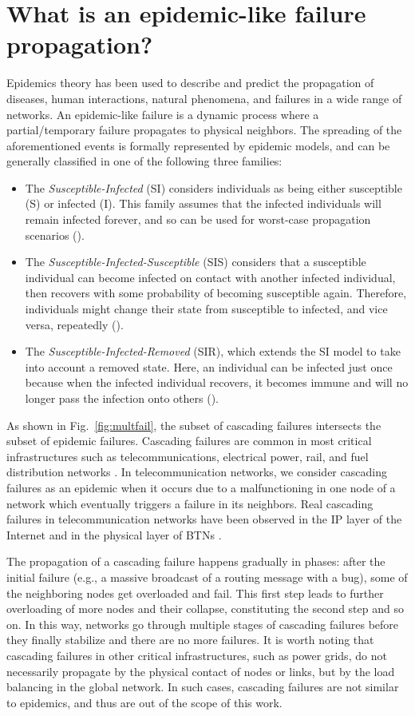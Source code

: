 \documentclass[10pt,draftclsnofoot,onecolumn,journal]{IEEEtran}
\begin{document}
\section{What is an epidemic-like failure propagation?\label{soa}}

Epidemics theory has been used to describe and predict the propagation of diseases, human interactions, natural phenomena, and failures in a wide range of networks. An epidemic-like failure is a dynamic process where a partial/temporary failure propagates to physical neighbors. The spreading of the aforementioned events is formally represented by epidemic models, and can be generally classified in one of the following three families:
\begin{itemize}
	\item The \emph{Susceptible-Infected} (SI) considers individuals as being either susceptible (S) or infected (I). This family assumes that the infected individuals will remain infected forever, and so can be used for worst-case propagation scenarios ().
	\item The \textit{Susceptible-Infected-Susceptible} (SIS) considers that a susceptible individual can become infected on contact with another infected individual, then recovers with some probability of becoming susceptible again. Therefore, individuals might change their state from susceptible to infected, and vice versa, repeatedly ().
	\item The \textit{Susceptible-Infected-Removed} (SIR), which extends the SI model to take into account a removed state. Here, an individual can be infected just once because when the infected individual recovers, it becomes immune and will no longer pass the infection onto others ().
\end{itemize}

As shown in Fig.~\ref{fig:multfail}, the subset of cascading failures intersects the subset of epidemic failures. Cascading failures are common in most critical infrastructures such as telecommunications, electrical power, rail, and fuel distribution networks \cite{Strogatz2001}. In telecommunication networks, we consider cascading failures as an epidemic when it occurs due to a malfunctioning in one node of a network which eventually triggers a failure in its neighbors. Real cascading failures in telecommunication networks have been observed in the IP layer of the Internet and in the physical layer of BTNs \cite{wrap32818}. 

The propagation of a cascading failure happens gradually in phases: after the initial failure (e.g., a massive broadcast of a routing message with a bug), some of the neighboring nodes get overloaded and fail. This first step leads to further overloading of more nodes and their collapse, constituting the second step and so on. In this way, networks go through multiple stages of cascading failures before they finally stabilize and there are no more failures. It is worth noting that cascading failures in other critical infrastructures, such as power grids, do not necessarily propagate by the physical contact of nodes or links, but by the load balancing in the global network. In such cases, cascading failures are not similar to epidemics, and thus are out of the scope of this work.
\end{document}
